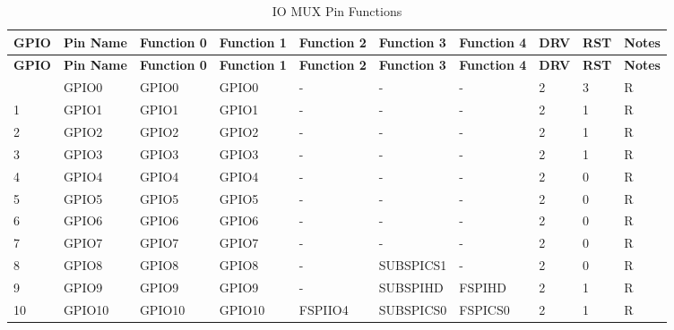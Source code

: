 \begin{longtable}[c]{|p{0.7cm}|p{1.9cm}|p{1.9cm}|p{1.7cm}|p{1.7cm}|p{1.8cm}|p{1.7cm}|p{0.5cm}<{\centering}|p{0.5cm}<{\centering}|p{0.7cm}<{\centering}| }
\caption{IO MUX Pin Functions}
    \label{tab:iomuxgpio-pin-functions} \\
        \hline
        \rowcolor{lightgray}
\textbf{GPIO} & \textbf{Pin Name} & \textbf{Function 0} & \textbf{Function 1} & \textbf{Function 2} & \textbf{Function 3} & \textbf{Function 4} & \textbf{DRV} & \textbf{RST} & \textbf{Notes} \\
 \hline
\endfirsthead
        \hline
        \rowcolor{lightgray}
        \textbf{GPIO} & \textbf{Pin Name} & \textbf{Function 0} & \textbf{Function 1} & \textbf{Function 2} & \textbf{Function 3} & \textbf{Function 4} & \textbf{DRV} & \textbf{RST} & \textbf{Notes} \\
        \hline
        \endhead
        \endfoot
0 & GPIO0            & GPIO0         & GPIO0   & -          & -            & -           & 2 & 3 & R \\ \hline
1 & GPIO1            & GPIO1         & GPIO1   & -          & -            & -           & 2 & 1 & R \\ \hline
2 & GPIO2            & GPIO2         & GPIO2   & -          & -            & -           & 2 & 1 & R \\ \hline
3 & GPIO3            & GPIO3         & GPIO3   & -          & -            & -           & 2 & 1 & R \\ \hline
4 & GPIO4            & GPIO4         & GPIO4   & -          & -            & -           & 2 & 0 & R \\ \hline
5 & GPIO5            & GPIO5         & GPIO5   & -          & -            & -           & 2 & 0 & R \\ \hline
6 & GPIO6            & GPIO6         & GPIO6   & -          & -            & -           & 2 & 0 & R \\ \hline
7 & GPIO7            & GPIO7         & GPIO7   & -          & -            & -           & 2 & 0 & R \\ \hline
8 & GPIO8            & GPIO8         & GPIO8   & -          & SUBSPICS1    & -           & 2 & 0 & R \\ \hline
9 & GPIO9            & GPIO9         & GPIO9   & -          & SUBSPIHD     & FSPIHD      & 2 & 1 & R \\ \hline
10 & GPIO10          &  GPIO10       & GPIO10  & FSPIIO4    & SUBSPICS0    & FSPICS0     & 2 & 1 & R \\ \hline

\end{longtable}
